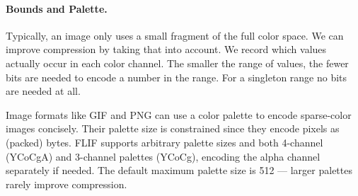 \documentclass{article}
\begin{document}
\paragraph{Bounds and Palette.}
Typically, an image only uses a small fragment of the full color space. We can improve compression by
taking that into account.
%
We record which values actually occur in each color channel. %
The smaller the range of values, the fewer bits are needed to encode a number in the range.
For a singleton range %
no bits are needed at all.

Image formats like GIF and PNG can use a color palette
to encode sparse-color images concisely.
Their palette size is constrained since they encode pixels as (packed) bytes.
FLIF supports arbitrary palette sizes and
both 4-channel (YCoCgA) and 3-channel palettes (YCoCg), encoding the
alpha channel separately if needed.
The default maximum palette size is 512 --- larger palettes rarely improve compression.



\end{document}
